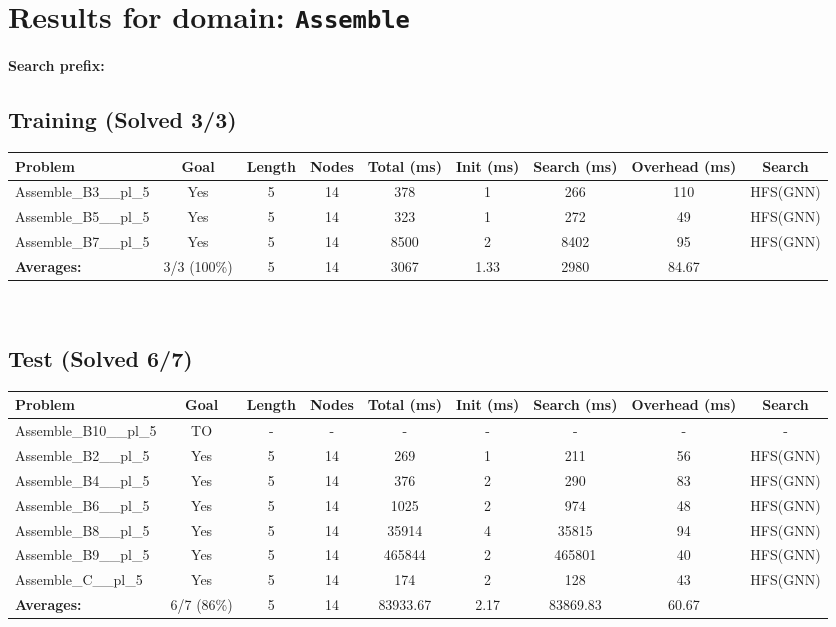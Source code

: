 \documentclass{article}
\begin{document}
\section*{Results for domain: \texttt{Assemble}}
\textbf{Search prefix:} 
\\[0.5cm]
\subsection*{Training (Solved 3/3)}
\begin{tabular}{lcccccccc}
\toprule
Problem & Goal & Length & Nodes & Total (ms) & Init (ms) & Search (ms) & Overhead (ms) & Search \\
\midrule
Assemble\_B3\_\_pl\_5 & Yes & 5 & 14 & 378 & 1 & 266 & 110 & HFS(GNN) \\
Assemble\_B5\_\_pl\_5 & Yes & 5 & 14 & 323 & 1 & 272 & 49 & HFS(GNN) \\
Assemble\_B7\_\_pl\_5 & Yes & 5 & 14 & 8500 & 2 & 8402 & 95 & HFS(GNN) \\
\textbf{Averages:} & 3/3 (100\%) & 5 & 14 & 3067 & 1.33 & 2980 & 84.67 & \\
\bottomrule
\end{tabular}
\\[0.7cm]
\subsection*{Test (Solved 6/7)}
\begin{tabular}{lcccccccc}
\toprule
Problem & Goal & Length & Nodes & Total (ms) & Init (ms) & Search (ms) & Overhead (ms) & Search \\
\midrule
Assemble\_B10\_\_pl\_5 & TO & - & - & - & - & - & - & - \\
Assemble\_B2\_\_pl\_5 & Yes & 5 & 14 & 269 & 1 & 211 & 56 & HFS(GNN) \\
Assemble\_B4\_\_pl\_5 & Yes & 5 & 14 & 376 & 2 & 290 & 83 & HFS(GNN) \\
Assemble\_B6\_\_pl\_5 & Yes & 5 & 14 & 1025 & 2 & 974 & 48 & HFS(GNN) \\
Assemble\_B8\_\_pl\_5 & Yes & 5 & 14 & 35914 & 4 & 35815 & 94 & HFS(GNN) \\
Assemble\_B9\_\_pl\_5 & Yes & 5 & 14 & 465844 & 2 & 465801 & 40 & HFS(GNN) \\
Assemble\_C\_\_pl\_5 & Yes & 5 & 14 & 174 & 2 & 128 & 43 & HFS(GNN) \\
\textbf{Averages:} & 6/7 (86\%) & 5 & 14 & 83933.67 & 2.17 & 83869.83 & 60.67 & \\
\bottomrule
\end{tabular}
\\[0.7cm]
\end{document}
